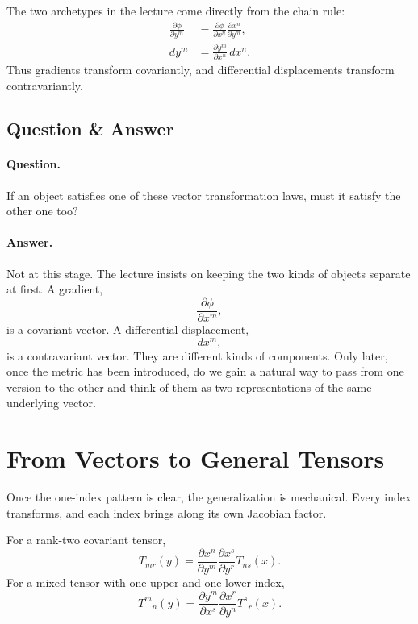 The two archetypes in the lecture come directly from the chain rule:
\begin{align}
\frac{\partial \phi}{\partial y^m}
&=
\frac{\partial \phi}{\partial x^n}
\frac{\partial x^n}{\partial y^m}, \\
dy^m
&=
\frac{\partial y^m}{\partial x^n}\,dx^n.
\end{align}
Thus gradients transform covariantly, and differential displacements transform contravariantly.

\subsection{Question \& Answer}

\paragraph{Question.} If an object satisfies one of these vector transformation laws, must it satisfy the other one too?

\paragraph{Answer.} Not at this stage. The lecture insists on keeping the two kinds of objects separate at first. A gradient,
\[
\frac{\partial \phi}{\partial x^m},
\]
is a covariant vector. A differential displacement,
\[
dx^m,
\]
is a contravariant vector. They are different kinds of components. Only later, once the metric has been introduced, do we gain a natural way to pass from one version to the other and think of them as two representations of the same underlying vector.

\section{From Vectors to General Tensors}

Once the one-index pattern is clear, the generalization is mechanical. Every index transforms, and each index brings along its own Jacobian factor.

For a rank-two covariant tensor,
\begin{equation}
T_{mr}(y)=
\frac{\partial x^n}{\partial y^m}
\frac{\partial x^s}{\partial y^r}
T_{ns}(x).
\end{equation}
For a mixed tensor with one upper and one lower index,
\begin{equation}
T^m{}_{n}(y)=
\frac{\partial y^m}{\partial x^s}
\frac{\partial x^r}{\partial y^n}
T^s{}_{r}(x).
\end{equation}

